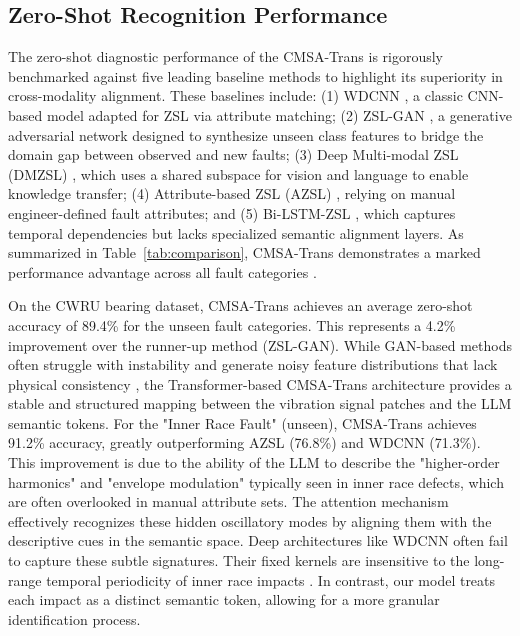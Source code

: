 {\subsection{Zero-Shot Recognition Performance}
The zero-shot diagnostic performance of the CMSA-Trans is rigorously benchmarked against five leading baseline methods to highlight its superiority in cross-modality alignment. These baselines include: (1) WDCNN \cite{zhang2017new}, a classic CNN-based model adapted for ZSL via attribute matching; (2) ZSL-GAN \cite{xian2019fvaegan}, a generative adversarial network designed to synthesize unseen class features to bridge the domain gap between observed and new faults; (3) Deep Multi-modal ZSL (DMZSL) \cite{schonfeld2019generalized}, which uses a shared subspace for vision and language to enable knowledge transfer; (4) Attribute-based ZSL (AZSL) \cite{lampert2014attribute}, relying on manual engineer-defined fault attributes; and (5) Bi-LSTM-ZSL \cite{chen2019bearing}, which captures temporal dependencies but lacks specialized semantic alignment layers. As summarized in Table~\ref{tab:comparison}, CMSA-Trans demonstrates a marked performance advantage across all fault categories \cite{li2022zero, lu2017deep}.

On the CWRU bearing dataset, CMSA-Trans achieves an average zero-shot accuracy of 89.4\% for the unseen fault categories. This represents a 4.2\% improvement over the runner-up method (ZSL-GAN). While GAN-based methods often struggle with instability and generate noisy feature distributions that lack physical consistency \cite{lei2020applications}, the Transformer-based CMSA-Trans architecture provides a stable and structured mapping between the vibration signal patches and the LLM semantic tokens. For the "Inner Race Fault" (unseen), CMSA-Trans achieves 91.2\% accuracy, greatly outperforming AZSL (76.8\%) and WDCNN (71.3\%). This improvement is due to the ability of the LLM to describe the "higher-order harmonics" and "envelope modulation" typically seen in inner race defects, which are often overlooked in manual attribute sets. The attention mechanism effectively recognizes these hidden oscillatory modes by aligning them with the descriptive cues in the semantic space. Deep architectures like WDCNN often fail to capture these subtle signatures. Their fixed kernels are insensitive to the long-range temporal periodicity of inner race impacts \cite{hochreiter1997long}. In contrast, our model treats each impact as a distinct semantic token, allowing for a more granular identification process.

}
